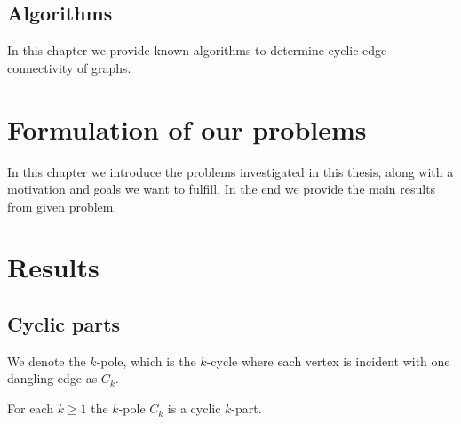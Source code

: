 \documentclass[12pt, twoside]{book}
\begin{document}
\section{Algorithms}\label{sec:algorithms}

In this chapter we provide known algorithms to determine cyclic edge connectivity of graphs.

\chapter{Formulation of our problems}\label{ch:problem-formulation}

In this chapter we introduce the problems investigated in this thesis, along with a motivation and goals we want to fulfill. In the end we provide the main results from given problem.

\chapter{Results}\label{ch:results}

\section{Cyclic parts}\label{sec:cyclic-part-results}

We denote the $k$-pole, which is the $k$-cycle where each vertex is incident with one dangling edge as $C_k$.

\begin{lemma}\label{lem:each-cycle-cyclic-part}
	For each $k\geq 1$ the $k$-pole $C_k$ is a cyclic $k$-part. 
\end{lemma}
\end{document}
